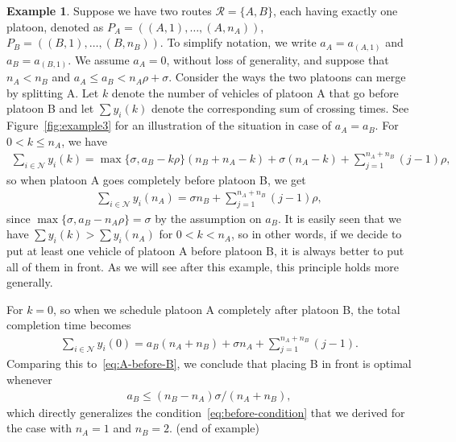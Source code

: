 \documentclass[a4paper]{report}
\theoremstyle{definition}
\newtheorem{eg}{Example}[chapter]
\theoremstyle{plain}
\begin{document}
\begin{eg}
  \label{example3}
  Suppose we have two routes $\mathcal{R} = \{ A, B \}$, each having exactly one
  platoon, denoted as $P_{A} = ((A,1), \dots, (A,n_{A}))$,
  $P_{B} = ((B,1), \dots, (B,n_{B}))$. To simplify notation, we write
  $a_{A} = a_{(A,1)}$ and $a_{B} = a_{(B,1)}$. We assume $a_{A} = 0$, without
  loss of generality, and suppose that $n_{A} < n_{B}$ and
  $a_{A} \leq a_{B} < n_{A}\rho + \sigma$. Consider the ways the two platoons
  can merge by splitting A. Let $k$ denote the number of vehicles of platoon A
  that go before platoon B and let $\sum y_{i}(k)$ denote the corresponding
  sum of crossing times. See Figure~\ref{fig:example3} for an illustration of the
  situation in case of $a_{A} = a_{B}$. For $0 < k \leq n_{A}$, we have
  \begin{align*}
    \sum_{i \in \mathcal{N}} y_{i} (k) = \max\{ \sigma, a_{B} - k\rho\} (n_{B} + n_{A} - k) + \sigma (n_{A} - k) + \sum_{j=1}^{n_{A}+n_{B}} (j-1) \rho ,
  \end{align*}
  so when platoon A goes completely before platoon B, we get
  \begin{align*}
    \sum_{i \in \mathcal{N}} y_{i} (n_{A}) = \sigma n_{B} + \sum_{j=1}^{n_{A}+n_{B}} (j-1) \rho ,
    \label{eq:A-before-B}
  \end{align*}
  since $\max\{ \sigma, a_{B} - n_{A} \rho \} = \sigma$ by the assumption on $a_{B}$. It is
  easily seen that we have $\sum y_{i}(k) > \sum y_{i} (n_{A})$ for $0 < k < n_{A}$,
  so in other words, if we decide to put at least one vehicle of platoon A
  before platoon B, it is always better to put all of them in front. As we will
  see after this example, this principle holds more generally.

  For $k=0$, so when we schedule platoon A completely after platoon B, the total
  completion time becomes
  \begin{align*}
    \sum_{i \in \mathcal{N}} y_{i} (0) = a_{B} (n_{A} + n_{B}) + \sigma n_{A} + \sum_{j=1}^{n_{A}+n_{B}} (j-1) .
  \end{align*}
  Comparing this to~\eqref{eq:A-before-B}, we conclude that placing B in front
  is optimal whenever
  \begin{align*}
    a_{B} \leq (n_{B} - n_{A}) \sigma / (n_{A} + n_{B}) ,
  \end{align*}
  which directly generalizes the condition~\eqref{eq:before-condition} that we
  derived for the case with $n_{A} = 1$ and $n_{B} = 2$. (end of example)
\end{eg}
\end{document}
